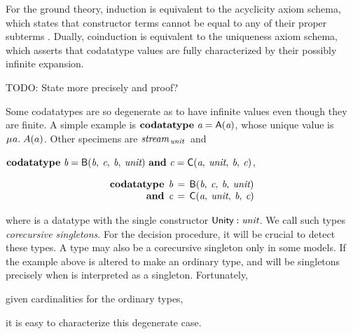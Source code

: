 For the ground theory, induction is equivalent to the acyclicity
axiom schema, which states that constructor terms cannot be equal to
any of their proper subterms \cite{barrett-et-al-2007}. Dually, coinduction
is equivalent to the uniqueness axiom schema, which asserts that codatatype
values are fully characterized by their possibly infinite expansion.

\begin{rep}
TODO: State more precisely and proof?
\end{rep}



{
Some codatatypes are so degenerate as to have infinite values
even though they are finite. A simple example is
\vthinspace$\textbf{codatatype}~\textit{a} = \textsf{A}(\textit{a})$, whose
unique value is $\MU a.\; A(a)$. Other specimens are
$\textit{stream}_{\,\textit{unit}\,}$
and
\begin{conf}%
\vthinspace$\textbf{codatatype}~\textit{b} = \textsf{B}(\textit{b},\: \textit{c},\: \textit{b},\: \textit{unit})
~\textbf{and}~ \textit{c} = \textsf{C}(\textit{a},\: \textit{unit},\: \textit{b},\: \textit{c})$,
\end{conf}%
\begin{rep}%
\[\begin{aligned}[t]
      \textbf{codatatype}\;\, \textit{b} & \,=\, \textsf{B}(\textit{b},\: \textit{c},\: \textit{b},\: \textit{unit}) \\[-1\jot]
      \textbf{and}\;\, \textit{c} & \,=\, \textsf{C}(\textit{a},\: \textit{unit},\: \textit{b},\: \textit{c})
\end{aligned}
\]
\end{rep}%
where  is a datatype with the single constructor $\textsf{Unity} :
\textit{unit}$. We call such types
\emph{corecursive singletons}. For the decision procedure, it will be
crucial to detect these types. %
A type may also be a corecursive singleton only in some models. If the example
above is altered to make  an ordinary type,  and  will be
singletons precisely when  is interpreted as a singleton.
Fortunately, \begin{rep}given cardinalities for the ordinary types, \end{rep}%
it is easy to characterize this degenerate case.

}

